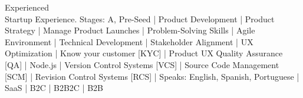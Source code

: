 
Experienced \\
{\scriptsize
Startup Experience. Stages: A, Pre-Seed
| Product Development
| Product Strategy
| Manage Product Launches
| Problem-Solving Skills
| Agile Environment
| Technical Development
| Stakeholder Alignment %
| UX Optimization
| Know your customer [KYC]
| Product UX Quality Assurance [QA]
| Node.js
| Version Control Systems [VCS]
| Source Code Management [SCM]
| Revision Control Systems [RCS]
| Speaks: English, Spanish, Portuguese
| SaaS
| B2C
| B2B2C
| B2B
}
\\

